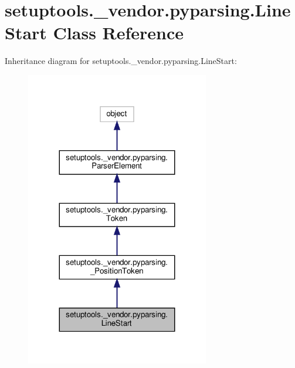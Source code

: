 \hypertarget{classsetuptools_1_1__vendor_1_1pyparsing_1_1LineStart}{}\section{setuptools.\+\_\+vendor.\+pyparsing.\+Line\+Start Class Reference}
\label{classsetuptools_1_1__vendor_1_1pyparsing_1_1LineStart}


Inheritance diagram for setuptools.\+\_\+vendor.\+pyparsing.\+Line\+Start\+:
\nopagebreak
\begin{figure}[H]
\begin{center}
\leavevmode
\includegraphics[width=227pt]{classsetuptools_1_1__vendor_1_1pyparsing_1_1LineStart__inherit__graph}
\end{center}
\end{figure}



